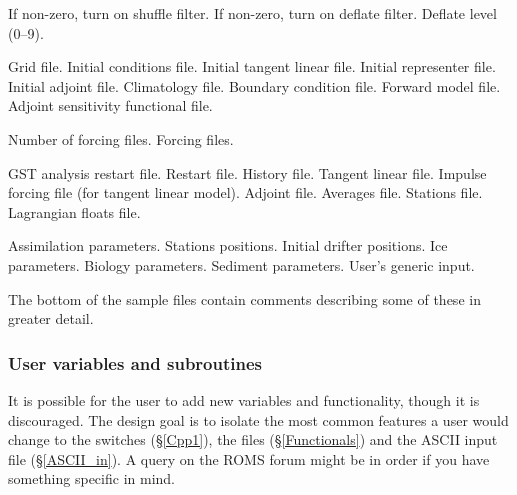 \begin{klist}
\begin{klist}
           If non-zero, turn on shuffle filter.
           If non-zero, turn on deflate filter.
           Deflate level (0--9).
     \end{klist}
    \mbox{}
     \begin{klist}
         Grid file.
         Initial conditions file.
         Initial tangent linear file.
         Initial representer file.
         Initial adjoint file.
         Climatology file.
         Boundary condition file.
         Forward model file.
         Adjoint sensitivity functional file.
     \end{klist}
     \mbox{}
     \begin{klist}
         Number of forcing files.
         Forcing files.
     \end{klist}
     \mbox{}
     \begin{klist}
         GST analysis restart file.
         Restart file.
         History file.
         Tangent linear file.
         Impulse forcing file (for tangent linear model).
         Adjoint file.
         Averages file.
         Stations file.
         Lagrangian floats file.
     \end{klist}
    \mbox{}
     \begin{klist}
         Assimilation parameters.
         Stations positions.
         Initial drifter positions.
         Ice parameters.
         Biology parameters.
         Sediment parameters.
         User's generic input.
     \end{klist}
\end{klist}
The bottom of the sample files contain comments describing some of these in
greater detail.


\subsubsection{User variables and subroutines}
\label{Store}
It is possible for the user to add new variables and functionality,
though it is discouraged. The design goal is to isolate the most common
features a user would change to the  switches
(\S\ref{Cpp1}), the  files (\S\ref{Functionals}) and
the ASCII input file (\S\ref{ASCII_in}). A query on the ROMS forum
might be in order if you have something specific in mind.

